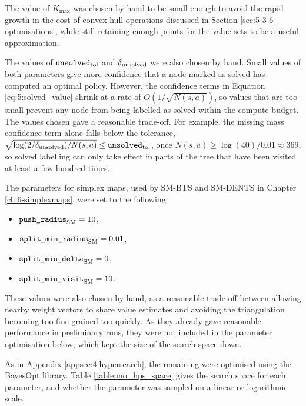     The value of $K_{\max}$ was chosen by hand to be small enough to avoid the rapid growth in the cost of convex hull operations discussed in Section \ref{sec:5-3-6-optimisations}, while still retaining enough points for the value sets to be a useful approximation.

    The values of ${\textnormal{\texttt{unsolved}}_{\textnormal{tol}}}$ and ${\delta_{\textnormal{unsolved}}}$ were also chosen by hand. Small values of both parameters give more confidence that a node marked as solved has computed an optimal policy. However, the confidence terms in Equation \eqref{eq:5:solved_value} shrink at a rate of $O(1/\sqrt{N(s,a)})$, so values that are too small prevent any node from being labelled as solved within the compute budget. The values chosen gave a reasonable trade-off. For example, the missing mass confidence term alone falls below the tolerance, $\sqrt{\log(2/{\delta_{\textnormal{unsolved}}})/N(s,a)} \leq {\textnormal{\texttt{unsolved}}_{\textnormal{tol}}}$, once $N(s,a) \geq \log(40)/0.01 \approx 369$, so solved labelling can only take effect in parts of the tree that have been visited at least a few hundred times.

    The parameters for simplex maps, used by SM-BTS and SM-DENTS in Chapter \ref{ch:6-simplexmaps}, were set to the following:
    \begin{itemize}
        \item ${\textnormal{\texttt{push\_radius}}_{{\textnormal{SM}}}}=10$,
        \item ${\textnormal{\texttt{split\_min\_radius}}_{{\textnormal{SM}}}}=0.01$,
        \item ${\textnormal{\texttt{split\_min\_delta}}_{{\textnormal{SM}}}}=0$,
        \item ${\textnormal{\texttt{split\_min\_visit}}_{{\textnormal{SM}}}}=10$.
    \end{itemize}

    These values were also chosen by hand, as a reasonable trade-off between allowing nearby weight vectors to share value estimates and avoiding the triangulation becoming too fine-grained too quickly. As they already gave reasonable performance in preliminary runs, they were not included in the parameter optimisation below, which kept the size of the search space down.


    As in Appendix \ref{appsec:4:hypersearch}, the remaining  were optimised using the BayesOpt library. Table \ref{table:mo_hps_space} gives the search space for each parameter, and whether the parameter was sampled on a linear or logarithmic scale.

